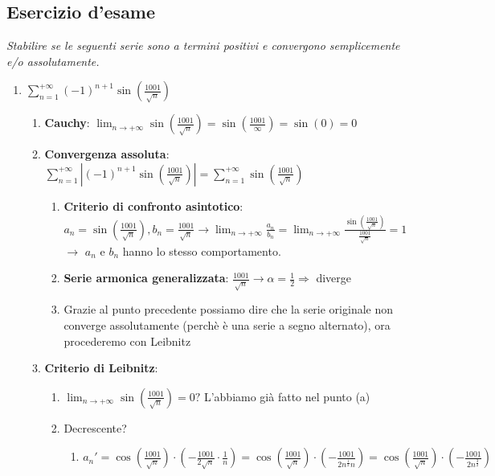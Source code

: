 \documentclass[10pt, a4paper]{article}
\begin{document}
    \subsection{Esercizio d'esame}
        \textit{Stabilire se le seguenti serie sono a termini positivi e convergono semplicemente e/o assolutamente.}
        \begin{enumerate}
            \item $\sum_{n=1}^{+\infty}(-1)^{n+1}\sin\left(\frac{1001}{\sqrt{n}}\right)$ 
            \begin{enumerate}
                \item \textbf{Cauchy}: $\lim_{n\rightarrow+\infty}\sin\left(\frac{1001}{\sqrt{n}}\right)=\sin\left(\frac{1001}{\infty}\right)=\sin(0)=0$
                \item \textbf{Convergenza assoluta}: $\sum_{n=1}^{+\infty}\left|(-1)^{n+1}\sin\left(\frac{1001}{\sqrt{n}}\right)\right|=\sum_{n=1}^{+\infty}\sin\left(\frac{1001}{\sqrt{n}}\right)$ 
                    \begin{enumerate}
                        \item \textbf{Criterio di confronto asintotico}: \scriptsize$a_n = \sin\left(\frac{1001}{\sqrt{n}}\right), b_n = \frac{1001}{\sqrt{n}} \rightarrow \lim_{n\rightarrow+\infty}\frac{a_n}{b_n}=\lim_{n\rightarrow+\infty}\frac{\sin\left(\frac{1001}{\sqrt{n}}\right)}{\frac{1001}{\sqrt{n}}}=1$\normalsize \\ $\rightarrow$ $a_n$ e $b_n$ hanno lo stesso comportamento.
                        \item \textbf{Serie armonica generalizzata}: $\frac{1001}{\sqrt{n}}\rightarrow\alpha=\frac{1}{2}\Rightarrow$ diverge
                        \item Grazie al punto precedente possiamo dire che la serie originale non converge assolutamente (perchè è una serie a segno alternato), ora procederemo con Leibnitz
                    \end{enumerate}
                \item \textbf{Criterio di Leibnitz}: 
                    \begin{enumerate}
                        \item $\lim_{n\rightarrow+\infty}\sin\left(\frac{1001}{\sqrt{n}}\right)=0?$ L'abbiamo già fatto nel punto (a)
                        \item Decrescente? \begin{enumerate}
                        \item $a_n'=\cos\left(\frac{1001}{\sqrt{n}}\right)\cdot\left(-\frac{1001}{2\sqrt{n}}\cdot\frac{1}{n}\right)=\cos\left(\frac{1001}{\sqrt{n}}\right)\cdot\left(-\frac{1001}{2n^{\frac{1}{2}}n}\right)=\cos\left(\frac{1001}{\sqrt{n}}\right)\cdot\left(-\frac{1001}{2n^{\frac{3}{2}}}\right)$

\end{enumerate}
\end{enumerate}
\end{enumerate}
\end{enumerate}
\end{document}
